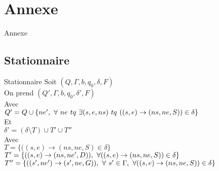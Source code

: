 \documentclass[12pt]{beamer}
\begin{document}
\section{Annexe}
\begin{frame}{Annexe}
    \tableofcontents[sections={<6>}]
\end{frame}

\subsection{Stationnaire}
\begin{frame}{Stationnaire}
    Soit $(Q, \Gamma, b, q_0, \delta, F)$\\
    On prend $(Q', \Gamma, b, q_0, \delta', F)$\\
    Avec\\
    \mbox{$Q' = Q \cup \{ne',\hspace{0.125cm}\forall \hspace{0.125cm} ne \hspace{0.125cm} tq \hspace{0.125cm} \exists (s,e,ns) \hspace{0.125cm} tq  \hspace{0.125cm} ((s,e)\rightarrow(ns,ne,S)) \in \delta\} $} \\
    Et\\
    $\delta'  = (\delta\setminus T) \cup T' \cup T''$ \\
    Avec\\
    $T = \{((s,e)\rightarrow(ns,ne,S) \in \delta \}$ \\
    $T' = \{((s,e)\rightarrow(ns,ne',D)),\hspace{0.125cm}\forall  ((s,e)\rightarrow(ns,ne,S)) \in \delta\} $\\
    $T'' = \{((s',ne')\rightarrow(s',ne,G)),\hspace{0.125cm}\forall \hspace{0.125cm} s' \in \Gamma, \hspace{0.125cm} \forall((s,e)\rightarrow(ns,ne,S)) \in \delta\}$\\
    
    
\end{frame}
\end{document}
